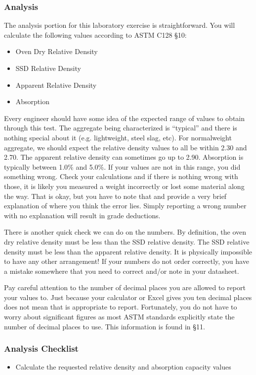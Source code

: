 \documentclass[12pt]{article}
\begin{document}
\subsubsection{Analysis}
The analysis portion for this laboratory exercise is straightforward. You will calculate the following values according to ASTM C128 \S 10:
\begin{itemize}
    \item Oven Dry Relative Density
    \item SSD Relative Density
    \item Apparent Relative Density
    \item Absorption
\end{itemize}

Every engineer should have some idea of the expected range of values to obtain through this test. The aggregate being characterized is ``typical'' and there is nothing special about it (e.g. lightweight, steel slag, etc). For normalweight aggregate, we should expect the relative density values to all be within 2.30 and 2.70. The apparent relative density can sometimes go up to 2.90. Absorption is typically between 1.0\% and 5.0\%. If your values are not in this range, you did something wrong. Check your calculations and if there is nothing wrong with those, it is likely you measured a weight incorrectly or lost some material along the way. That is okay, but you have to note that and provide a very brief explanation of where you think the error lies. Simply reporting a wrong number with no explanation will result in grade deductions.

There is another quick check we can do on the numbers. By definition, the oven dry relative density must be less than the SSD relative density. The SSD relative density must be less than the apparent relative density. It is physically impossible to have any other arrangement! If your numbers do not order correctly, you have a mistake somewhere that you need to correct and/or note in your datasheet.

Pay careful attention to the number of decimal places you are allowed to report your values to. Just because your calculator or Excel gives you ten decimal places does not mean that is appropriate to report. Fortunately, you do not have to worry about significant figures as most ASTM standards explicitly state the number of decimal places to use. This information is found in \S11.

\subsubsection*{Analysis Checklist}
\begin{itemize}
    \item Calculate the requested relative density and absorption capacity values
\end{itemize}
\end{document}

